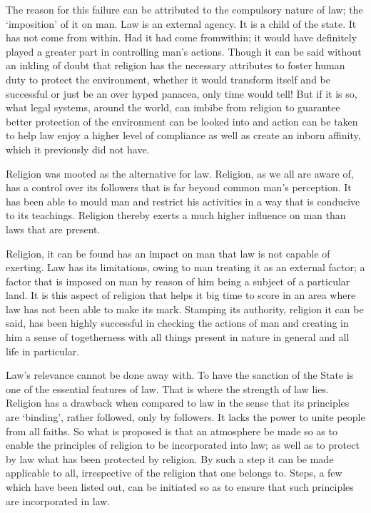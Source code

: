 \begin{multicols}{2}
\vspace{-.1cm}

\noi
The reason for this failure can be attributed to the compulsory nature of law; the ‘imposition’
of it on man. Law is an external agency. It is a child of the state. It has not come from within.
Had it had come fromwithin; it would have definitely played a greater part in controlling man’s
actions. Though it can be said without an inkling of doubt that religion has the necessary
attributes to foster human duty to protect the environment, whether it would transform itself
and be successful or just be an over hyped panacea, only time would tell! But if it is so, what
legal systems, around the world, can imbibe from religion to guarantee better protection of the
environment can be looked into and action can be taken to help law enjoy a higher level of
compliance as well as create an inborn affinity, which it previously did not have.

\vspace{-.2cm}


\vspace{-.1cm}

\noi
Religion was mooted as the alternative for law. Religion, as we all are aware of, has a control
over its followers that is far beyond common man’s perception. It has been able to mould man
and restrict his activities in a way that is conducive to its teachings. Religion thereby exerts a
much higher influence on man than laws that are present.

\noi
Religion, it can be found has an impact on man that law is not capable of exerting. Law has
its limitations, owing to man treating it as an external factor; a factor that is imposed on man
by reason of him being a subject of a particular land. It is this aspect of religion that helps it
big time to score in an area where law has not been able to make its mark. Stamping its
authority, religion it can be said, has been highly successful in checking the actions of man and
creating in him a sense of togetherness with all things present in nature in general and all life
in particular.


\noi
Law’s relevance cannot be done away with. To have the sanction of the State is one of the
essential features of law. That is where the strength of law lies. Religion has a drawback when
compared to law in the sense that its principles are ‘binding’, rather followed, only by
followers. It lacks the power to unite people from all faiths. So what is proposed is that an 
atmosphere be made so as to enable the principles of religion to be incorporated into law; as
well as to protect by law what has been protected by religion. By such a step it can be made
applicable to all, irrespective of the religion that one belongs to. Steps, a few which have been
listed out, can be initiated so as to ensure that such principles are incorporated in law.


\end{multicols}
